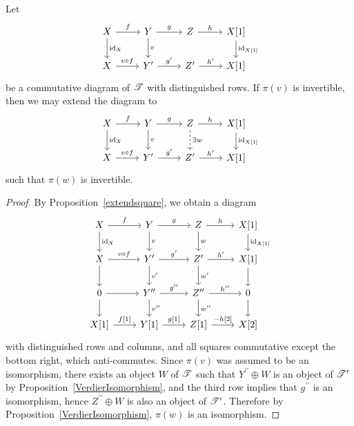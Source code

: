 \documentclass[dissertation.tex]{subfiles}
\begin{document}
\begin{lem}\label{VerdierExtendSquare}
  Let
  $$\begin{tikzcd}
    X \arrow{r}{f}\arrow{d}{\id_X} & Y \arrow{r}{g}\arrow{d}{v} & Z \arrow{r}{h} & X[1]\arrow{d}{\id_{X[1]}}\\
    X \arrow{r}{v \circ f} & Y^\prime \arrow{r}{g^\prime} & Z^\prime \arrow{r}{h^\prime} & X[1]
  \end{tikzcd}$$
  be a commutative diagram of $\mathscr{T}$ with distinguished rows.
  If $\pi(v)$ is invertible, then we may extend the diagram to 
  $$\begin{tikzcd}
    X \arrow{r}{f}\arrow{d}{\id_X} & Y \arrow{r}{g}\arrow{d}{v} & Z \arrow{r}{h}\arrow[dashed]{d}{\exists w} & X[1]\arrow{d}{\id_{X[1]}}\\
    X \arrow{r}{v \circ f} & Y^\prime \arrow{r}{g^\prime} & Z^\prime \arrow{r}{h^\prime} & X[1]
  \end{tikzcd}$$
  such that $\pi(w)$ is invertible.

  \begin{proof}
    By Proposition~\ref{extendsquare}, we obtain a diagram
    $$\begin{tikzcd}
      X \arrow{r}{f}\arrow{d}{\id_X} & Y \arrow{r}{g}\arrow{d}{v} & Z \arrow{r}{h}\arrow{d}{w} & X[1]\arrow{d}{\id_{X[1]}}\\
      X \arrow{r}{v \circ f}\arrow{d} & Y^\prime \arrow{r}{g^\prime}\arrow{d}{v^{\prime}} & Z^\prime \arrow{r}{h^\prime}\arrow{d}{w^{\prime}} & X[1]\arrow{d}\\
      0 \arrow{r}\arrow{d} & Y^{\prime\prime} \arrow{r}{g^{\prime\prime}}\arrow{d}{v^{\prime\prime}} & Z^{\prime\prime} \arrow{r}{h^{\prime\prime}}\arrow{d}{w^{\prime\prime}}& 0\arrow{d}\\
      X[1] \arrow{r}{f[1]} & Y[1] \arrow{r}{g[1]} & Z[1] \arrow{r}{-h[2]} & X[2]
    \end{tikzcd}$$
    with distinguished rows and columns, and all squares commutative except the bottom right, which anti-commutes.
    Since $\pi(v)$ was assumed to be an isomorphism, there exists an object $W$ of $\mathscr{T}$ such that $Y^{\prime\prime} \oplus W$ is an object of $\mathscr{T}^{\prime}$ by Proposition~\ref{VerdierIsomorphism}, and the third row implies that $g^{\prime\prime}$ is an isomorphism, hence $Z^{\prime\prime} \oplus W$ is also an object of $\mathscr{T}^\prime$.
    Therefore by Proposition~\ref{VerdierIsomorphism}, $\pi(w)$ is an isomorphism.
  \end{proof}
\end{lem}
\end{document}
